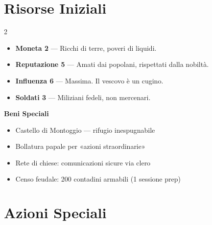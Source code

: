 \section{Risorse Iniziali}


\begin{multicols}{2}
\begin{itemize}
  \item \textbf{Moneta 2} — Ricchi di terre, poveri di liquidi.
  \item \textbf{Reputazione 5} — Amati dai popolani, rispettati dalla nobiltà.
  \item \textbf{Influenza 6} — Massima. Il vescovo è un cugino.
  \item \textbf{Soldati 3} — Miliziani fedeli, non mercenari.
\end{itemize}
\columnbreak
\textbf{Beni Speciali}
\begin{itemize}
  \item Castello di Montoggio — rifugio inespugnabile
  \item Bollatura papale per «azioni straordinarie»
  \item Rete di chiese: comunicazioni sicure via clero
  \item Censo feudale: 200 contadini armabili (1 sessione prep)
\end{itemize}
\end{multicols}

\section{Azioni Speciali}




